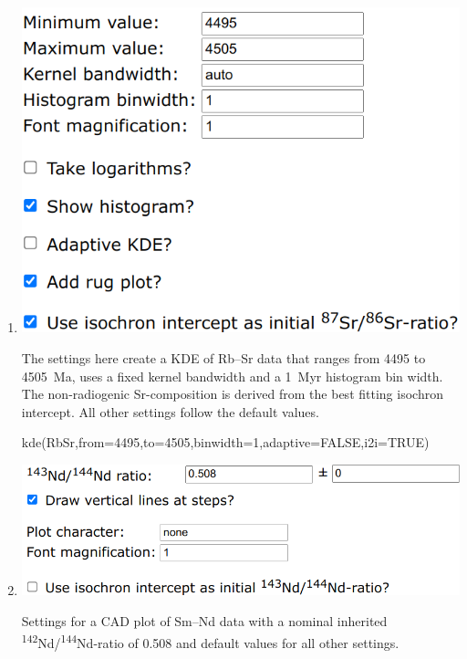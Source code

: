 \begin{refsection}
\begin{enumerate}
\item\noindent\begin{minipage}[t]{.55\linewidth}
\strut\vspace*{-\baselineskip}\newline
\includegraphics[width=\linewidth]{../figures/RbSrKDE.png}
\end{minipage}
\begin{minipage}[t]{.45\linewidth}
  The settings here create a KDE of Rb--Sr data that ranges from 4495
  to 4505~Ma, uses a fixed \citet{botev2010} kernel bandwidth and a
  1~Myr histogram bin width. The non-radiogenic Sr-composition is
  derived from the best fitting isochron intercept.  All other
  settings follow the default values.
\end{minipage}

\begin{console}
kde(RbSr,from=4495,to=4505,binwidth=1,adaptive=FALSE,i2i=TRUE)
\end{console}

\item\noindent\begin{minipage}[t]{.65\linewidth}
\strut\vspace*{-\baselineskip}\newline
\includegraphics[width=\linewidth]{../figures/SmNdCAD.png}
\end{minipage}
\begin{minipage}[t]{.35\linewidth}
  Settings for a CAD plot of Sm--Nd data with a nominal inherited
  \textsuperscript{142}Nd/\textsuperscript{144}Nd-ratio of 0.508
  and default values for all other settings.
\end{minipage}


\end{enumerate}
\end{refsection}
